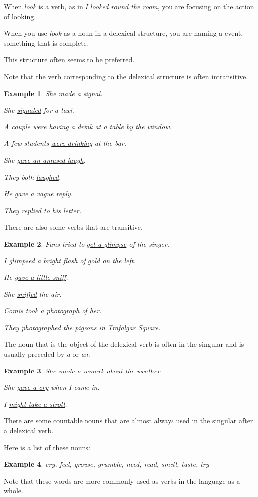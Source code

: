 \documentclass[oneside]{book}
\numberwithin{equation}{section}
\newtheorem{example}{Example}[section]
\begin{document}
When \textit{look} is a verb, as in \textit{I looked round the room}, you are focusing on the action of looking.

When you use \textit{look} as a noun in a delexical structure, you are naming a event, something that is complete.

This structure often seems to be preferred.

Note that the verb corresponding to the delexical structure is often intransitive.
\begin{example}
    She \underline{made a signal}.
    
    She \underline{signaled} for a taxi.
    
    A couple \underline{were having a drink} at a table by the window.
    
    A few students \underline{were drinking} at the bar.
    
    She \underline{gave an amused laugh}.
    
    They both \underline{laughed}.
    
    He \underline{gave a vague reply}.
    
    They \underline{replied} to his letter.
\end{example}
There are also some verbs that are transitive.
\begin{example}
    Fans tried to \underline{get a glimpse} of the singer.
    
    I \underline{glimpsed} a bright flash of gold on the left.
    
    He \underline{gave a little sniff}.
    
    She \underline{sniffed} the air.
    
    Comis \underline{took a photograph} of her.
    
    They \underline{photographed} the pigeons in Trafalgar Square.
\end{example}
%
\noindent{} The noun that is the object of the delexical verb is often in the singular and is usually preceded by \textit{a} or \textit{an}.
\begin{example}
    She \underline{made a remark} about the weather.
    
    She \underline{gave a cry} when I came in.
    
    I \underline{might take a stroll}.
\end{example}
There are some countable nouns that are almost always used in the singular after a delexical verb.

Here is a list of these nouns:
\begin{example}
    cry, feel, grouse, grumble, need, read, smell, taste, try
\end{example}
Note that these words are more commonly used as verbs in the language as a whole.
\end{document}
